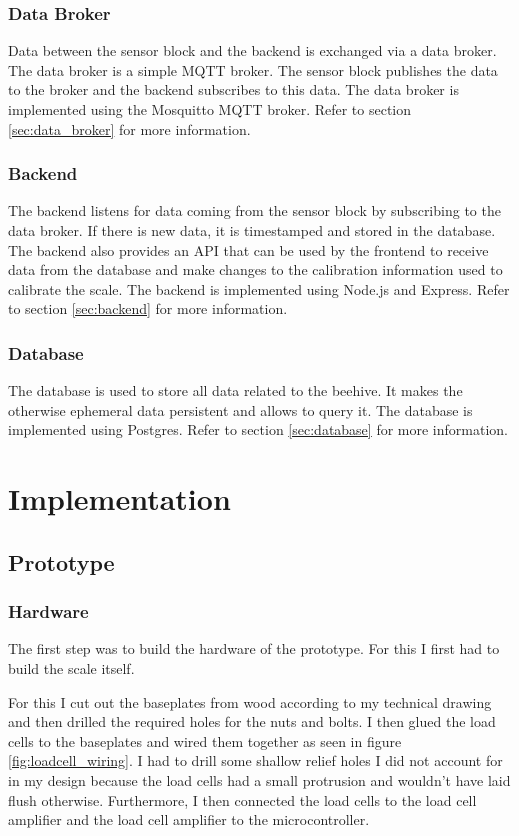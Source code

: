 \subsubsection{Data Broker}
Data between the sensor block and the backend is exchanged via a data broker. The data broker is a simple MQTT broker. The sensor block publishes the data to the broker and the backend subscribes to this data. The data broker is implemented using the Mosquitto MQTT broker. Refer to section \ref{sec:data_broker} for more information.

\subsubsection{Backend}
The backend listens for data coming from the sensor block by subscribing to the data broker. If there is new data, it is timestamped and stored in the database. The backend also provides an API that can be used by the frontend to receive data from the database and make changes to the calibration information used to calibrate the scale. The backend is implemented using Node.js and Express. Refer to section \ref{sec:backend} for more information.

\subsubsection{Database}
The database is used to store all data related to the beehive. It makes the otherwise ephemeral data persistent and allows to query it. The database is implemented using Postgres. Refer to section \ref{sec:database} for more information.

\newpage
\section{Implementation}


\subsection{Prototype}
\subsubsection {Hardware} \label{sec:hardware}
The first step was to build the hardware of the prototype. For this I first had to build the scale itself.

For this I cut out the baseplates from wood according to my technical drawing and then drilled the required holes for the nuts and bolts. I then glued the load cells to the baseplates and wired them together as seen in figure \ref{fig:loadcell_wiring}. I had to drill some shallow relief holes I did not account for in my design because the load cells had a small protrusion and wouldn't have laid flush otherwise. Furthermore, I then connected the load cells to the load cell amplifier and the load cell amplifier to the microcontroller.

